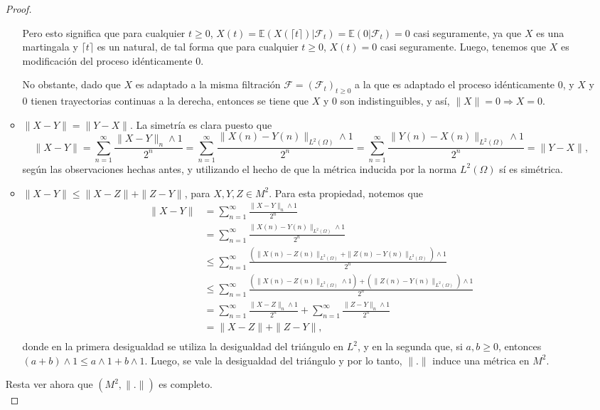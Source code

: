 \documentclass[letterpaper]{article}
\newcommand{\F}{\mathcal{F}}
\newcommand{\ent}{\Longrightarrow}
\newcommand{\E}{\mathbb{E}}
\newcommand{\1}{\mathds{1}}
\theoremstyle{definition}
\theoremstyle{definition}
\theoremstyle{definition}
\theoremstyle{definition}
\theoremstyle{definition}
\begin{document}
\begin{enumerate}
\begin{proof}
\begin{itemize}
        Pero esto significa que para cualquier $t\geq0$, $X(t)=\E\left(X\left(\lceil t \rceil\right)|\F_t\right)=\E(0|\F_t)=0$ casi seguramente,
        ya que $X$ es una martingala y $\lceil t \rceil$ es un natural, de tal forma que para cualquier $t\geq0$,
        $X(t)=0$ casi seguramente. Luego, tenemos que $X$ es modificación del proceso idénticamente 0.
        \newline
        
        No obstante, dado que $X$ es adaptado a la misma filtración $\F=(\F_t)_{t\geq0}$ a la que es adaptado el 
        proceso idénticamente $0$, y $X$ y $0$ tienen trayectorias continuas a la derecha, entonces 
        se tiene que $X$ y $0$ son indistinguibles, y así, $\|X\|=0 \ent X=0$.
        \newline
        \item $\|X-Y\|=\|Y-X\|$. La simetría es clara puesto que 
        \[
            \|X-Y\|=\sum_{n=1}^{\infty} \frac{\|X-Y\|_n\wedge1}{2^n}=\sum_{n=1}^{\infty} \frac{\|X(n)-Y(n)\|_{L^2(\Omega)}\wedge1}{2^n}=\sum_{n=1}^{\infty} \frac{\|Y(n)-X(n)\|_{L^2(\Omega)}\wedge1}{2^n}=\|Y-X\|,
        \]
        según las observaciones hechas antes, y utilizando el hecho de que la métrica inducida por la norma $L^2(\Omega)$ sí es simétrica.
        \newline

        \item $\|X-Y\|\leq \|X-Z\|+\|Z-Y\|$, para $X,Y,Z\in M^2$. Para esta propiedad, notemos que
        \begin{align*}
            \|X-Y\|&=\sum_{n=1}^{\infty} \frac{\|X-Y\|_n\wedge1}{2^n}\\
            &=\sum_{n=1}^{\infty} \frac{\|X(n)-Y(n)\|_{L^2(\Omega)}\wedge1}{2^n}\\
            &\leq \sum_{n=1}^{\infty} \frac{\left(\|X(n)-Z(n)\|_{L^2(\Omega)}+\|Z(n)-Y(n)\|_{L^2(\Omega)}\right)\wedge1}{2^n}\\
            &\leq\sum_{n=1}^{\infty} \frac{\left(\|X(n)-Z(n)\|_{L^2(\Omega)}\wedge1\right)+\left(\|Z(n)-Y(n)\|_{L^2(\Omega)}\right)\wedge1}{2^n}\\
            &=\sum_{n=1}^{\infty} \frac{\|X-Z\|_{n}\wedge1}{2^{n}}+\sum_{n=1}^{\infty}\frac{\|Z-Y\|_{n}\wedge1}{2^n}\\
            &=\|X-Z\|+\|Z-Y\|,\\
        \end{align*}
        donde en la primera desigualdad se utiliza la desigualdad del triángulo en $L^2$, y en la segunda que, si $a,b\geq0$, entonces
        $(a+b)\wedge 1\leq a\wedge 1 + b\wedge 1$. Luego, se vale la desigualdad del triángulo y por lo tanto, $\|.\|$ induce una métrica en $M^2$.
    \end{itemize}
     Resta ver ahora que $(M^2,\|.\|)$ es completo.\\
        

\end{proof}
\end{enumerate}
\end{document}
